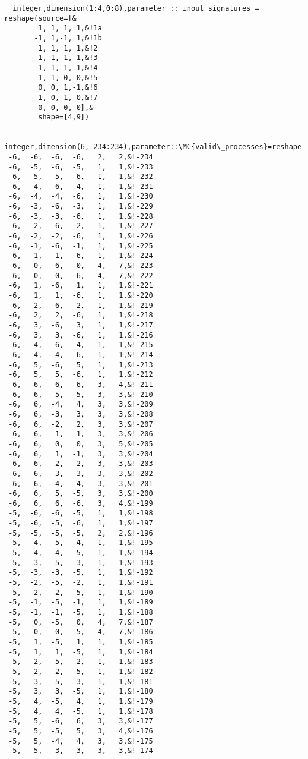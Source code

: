 \begin{Verbatim}
  integer,dimension(1:4,0:8),parameter :: inout_signatures = reshape(source=[&
        1, 1, 1, 1,&!1a
       -1, 1,-1, 1,&!1b
        1, 1, 1, 1,&!2
        1,-1, 1,-1,&!3
        1,-1, 1,-1,&!4
        1,-1, 0, 0,&!5
        0, 0, 1,-1,&!6
        1, 0, 1, 0,&!7
        0, 0, 0, 0],&
        shape=[4,9])

  integer,dimension(6,-234:234),parameter::\MC{valid\_processes}=reshape([&
 -6,  -6,  -6,  -6,   2,   2,&!-234
 -6,  -5,  -6,  -5,   1,   1,&!-233
 -6,  -5,  -5,  -6,   1,   1,&!-232
 -6,  -4,  -6,  -4,   1,   1,&!-231
 -6,  -4,  -4,  -6,   1,   1,&!-230
 -6,  -3,  -6,  -3,   1,   1,&!-229
 -6,  -3,  -3,  -6,   1,   1,&!-228
 -6,  -2,  -6,  -2,   1,   1,&!-227
 -6,  -2,  -2,  -6,   1,   1,&!-226
 -6,  -1,  -6,  -1,   1,   1,&!-225
 -6,  -1,  -1,  -6,   1,   1,&!-224
 -6,   0,  -6,   0,   4,   7,&!-223
 -6,   0,   0,  -6,   4,   7,&!-222
 -6,   1,  -6,   1,   1,   1,&!-221
 -6,   1,   1,  -6,   1,   1,&!-220
 -6,   2,  -6,   2,   1,   1,&!-219
 -6,   2,   2,  -6,   1,   1,&!-218
 -6,   3,  -6,   3,   1,   1,&!-217
 -6,   3,   3,  -6,   1,   1,&!-216
 -6,   4,  -6,   4,   1,   1,&!-215
 -6,   4,   4,  -6,   1,   1,&!-214
 -6,   5,  -6,   5,   1,   1,&!-213
 -6,   5,   5,  -6,   1,   1,&!-212
 -6,   6,  -6,   6,   3,   4,&!-211
 -6,   6,  -5,   5,   3,   3,&!-210
 -6,   6,  -4,   4,   3,   3,&!-209
 -6,   6,  -3,   3,   3,   3,&!-208
 -6,   6,  -2,   2,   3,   3,&!-207
 -6,   6,  -1,   1,   3,   3,&!-206
 -6,   6,   0,   0,   3,   5,&!-205
 -6,   6,   1,  -1,   3,   3,&!-204
 -6,   6,   2,  -2,   3,   3,&!-203
 -6,   6,   3,  -3,   3,   3,&!-202
 -6,   6,   4,  -4,   3,   3,&!-201
 -6,   6,   5,  -5,   3,   3,&!-200
 -6,   6,   6,  -6,   3,   4,&!-199
 -5,  -6,  -6,  -5,   1,   1,&!-198
 -5,  -6,  -5,  -6,   1,   1,&!-197
 -5,  -5,  -5,  -5,   2,   2,&!-196
 -5,  -4,  -5,  -4,   1,   1,&!-195
 -5,  -4,  -4,  -5,   1,   1,&!-194
 -5,  -3,  -5,  -3,   1,   1,&!-193
 -5,  -3,  -3,  -5,   1,   1,&!-192
 -5,  -2,  -5,  -2,   1,   1,&!-191
 -5,  -2,  -2,  -5,   1,   1,&!-190
 -5,  -1,  -5,  -1,   1,   1,&!-189
 -5,  -1,  -1,  -5,   1,   1,&!-188
 -5,   0,  -5,   0,   4,   7,&!-187
 -5,   0,   0,  -5,   4,   7,&!-186
 -5,   1,  -5,   1,   1,   1,&!-185
 -5,   1,   1,  -5,   1,   1,&!-184
 -5,   2,  -5,   2,   1,   1,&!-183
 -5,   2,   2,  -5,   1,   1,&!-182
 -5,   3,  -5,   3,   1,   1,&!-181
 -5,   3,   3,  -5,   1,   1,&!-180
 -5,   4,  -5,   4,   1,   1,&!-179
 -5,   4,   4,  -5,   1,   1,&!-178
 -5,   5,  -6,   6,   3,   3,&!-177
 -5,   5,  -5,   5,   3,   4,&!-176
 -5,   5,  -4,   4,   3,   3,&!-175
 -5,   5,  -3,   3,   3,   3,&!-174

\end{Verbatim}
